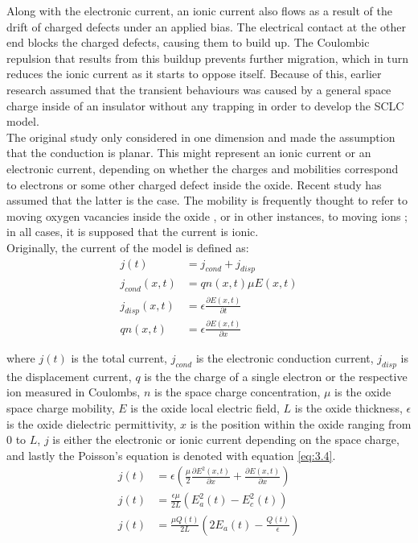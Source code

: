 \noindent Along with the electronic current, an ionic current also flows as a result of the drift of charged defects under an applied bias. The electrical contact at the other end blocks the charged defects, causing them to build up. The Coulombic repulsion that results from this buildup prevents further migration, which in turn reduces the ionic current as it starts to oppose itself. Because of this, earlier research assumed that the transient behaviours was caused by a general space charge inside of an insulator without any trapping in order to develop the SCLC model. \\

\noindent The original study only considered in one dimension and made the assumption that the conduction is planar. This might represent an ionic current or an electronic current, depending on whether the charges and mobilities correspond to electrons or some other charged defect inside the oxide. Recent study has assumed that the latter is the case. The mobility is frequently thought to refer to moving oxygen vacancies inside the oxide \cite{zafar1998oxygen}, or in other instances, to moving ions \cite{chen2010observation}; in all cases, it is supposed that the current is ionic. \\

\noindent Originally, the current of the model is defined as:
\begin{align}
j(t) &= j_{cond} + j_{disp} \label{eq:3.1} \\
j_{cond}(x,t) &= qn(x,t)\mu E(x,t) \label{eq:3.2} \\
j_{disp}(x,t) &= \epsilon \frac{\partial E(x,t)}{\partial t} \label{eq:3.3} \\
qn(x,t) &=  \epsilon \frac{\partial E(x,t)}{\partial x} \label{eq:3.4}
\end{align}

\noindent where $j(t)$ is the total current, $j_{cond}$ is the electronic conduction current, $j_{disp}$ is the displacement current, $q$ is the the charge of a single electron or the respective ion measured in Coulombs, $n$ is the space charge concentration, $\mu$ is the oxide space charge mobility, $E$ is the oxide local electric field, $L$ is the oxide thickness, $\epsilon$ is the oxide dielectric permittivity, $x$ is the position within the oxide ranging from 0 to $L$, $j$ is either the electronic or ionic current depending on the space charge, and lastly the Poisson's equation is denoted with equation \ref{eq:3.4}.
\begin{align}
j(t) &= \epsilon \left( \frac{\mu}{2} \frac{\partial E^{2}(x,t)}{\partial x} + \frac{\partial E(x,t)}{\partial x} \right) \label{eq:3.5} \\
j(t) &= \frac{\epsilon \mu}{2L}\left( E^{2}_{a}(t) - E^{2}_{c}(t) \right) \label{eq:3.6} \\
j(t) &= \frac{\mu Q(t)}{2L}\left( 2E_a(t) - \frac{Q(t)}{\epsilon} \right) \label{eq:3.7}
\end{align}

